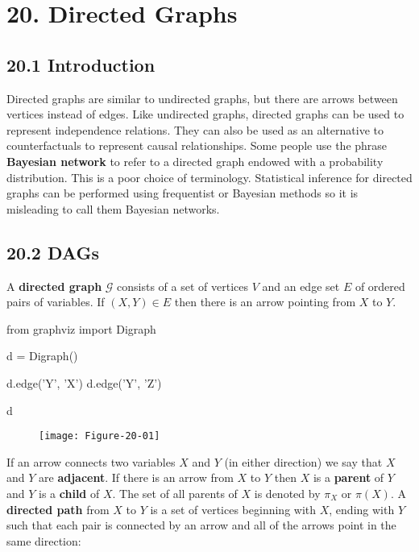 \section*{20. Directed Graphs}\label{directed-graphs}

\subsection*{20.1 Introduction}\label{introduction}

Directed graphs are similar to undirected graphs, but there are arrows
between vertices instead of edges. Like undirected graphs, directed
graphs can be used to represent independence relations. They can also be
used as an alternative to counterfactuals to represent causal
relationships. Some people use the phrase \textbf{Bayesian network} to
refer to a directed graph endowed with a probability distribution. This
is a poor choice of terminology. Statistical inference for directed
graphs can be performed using frequentist or Bayesian methods so it is
misleading to call them Bayesian networks.

\subsection*{20.2 DAGs}\label{dags}

A \textbf{directed graph} \(\mathcal{G}\) consists of a set of vertices
\(V\) and an edge set \(E\) of ordered pairs of variables. If
\((X, Y) \in E\) then there is an arrow pointing from \(X\) to \(Y\).

\begin{python}
from graphviz import Digraph

d = Digraph()

d.edge('Y', 'X')
d.edge('Y', 'Z')

d
\end{python}

\begin{figure}[H]
\centering
\texttt{[image: Figure-20-01]}
\end{figure}

If an arrow connects two variables \(X\) and \(Y\) (in either direction)
we say that \(X\) and \(Y\) are \textbf{adjacent}. If there is an arrow
from \(X\) to \(Y\) then \(X\) is a \textbf{parent} of \(Y\) and \(Y\)
is a \textbf{child} of \(X\). The set of all parents of \(X\) is denoted
by \(\pi_X\) or \(\pi(X)\). A \textbf{directed path} from \(X\) to \(Y\)
is a set of vertices beginning with \(X\), ending with \(Y\) such that
each pair is connected by an arrow and all of the arrows point in the
same direction:

